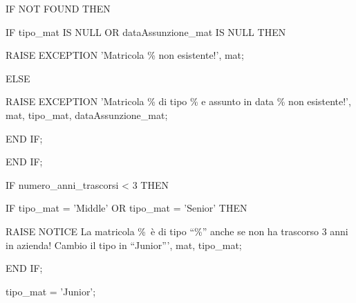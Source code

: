 \begin{flushleft}
\begin{description}
\begin{description}
                                    \item IF NOT FOUND THEN
                                    \begin{description}
                                        \item IF tipo\_mat IS NULL OR dataAssunzione\_mat IS NULL THEN
                                        \begin{description}
                                            \item RAISE EXCEPTION 'Matricola \% non esistente!', mat;
                                        \end{description}
                                        \item ELSE
                                        \begin{description}
                                            \item RAISE EXCEPTION 'Matricola \% di tipo \% e assunto in data \% non esistente!', mat, tipo\_mat, dataAssunzione\_mat;
                                        \end{description}
                                        \item END IF;
                                    \end{description}
                                    \item END IF;
                                        
                                        \item IF numero\_anni\_trascorsi < 3 THEN
                                        \begin{description}
                                            \item IF tipo\_mat = 'Middle' OR tipo\_mat = 'Senior' THEN
                                            \begin{description}
                                                \item RAISE NOTICE La matricola \%\ \`e di tipo ``\%'' anche se non ha trascorso 3 anni in azienda! Cambio il tipo in ``Junior''', mat, tipo\_mat;
                                            \end{description}
                                            \item END IF;
                                            \item tipo\_mat = 'Junior';
                                        \end{description}


\end{description}
\end{description}
\end{flushleft}
